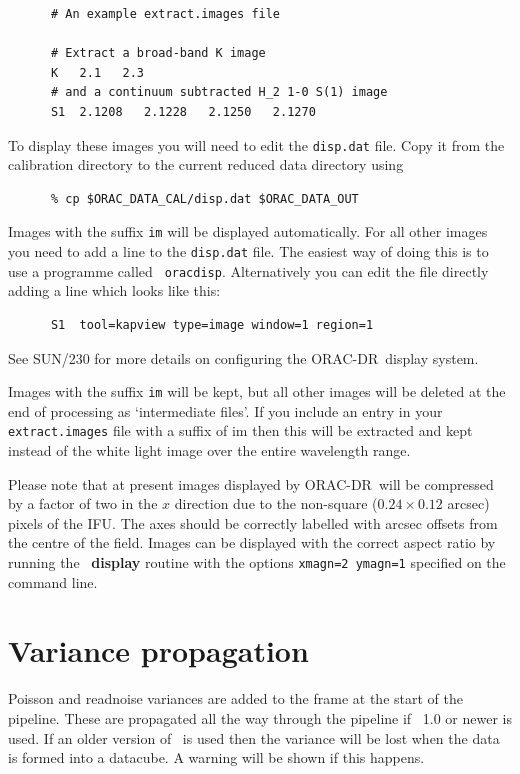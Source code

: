 \documentclass[twoside,11pt]{article}
\newcommand{\xref}[3]{#1}
\renewcommand{\_}{\texttt{\symbol{95}}}
\newcommand{\KAPPA}{\xref{{\sc{Kappa}}}{sun95}{}}
\newcommand{\ORACDR}{{\footnotesize ORAC-DR}}
\begin{document}
\begin{verbatim}
      # An example extract.images file

      # Extract a broad-band K image
      K   2.1   2.3
      # and a continuum subtracted H_2 1-0 S(1) image
      S1  2.1208   2.1228   2.1250   2.1270
\end{verbatim}

To display these images you will need to edit the {\tt disp.dat} file.
Copy it from the calibration directory to the current reduced data
directory using

\begin{verbatim}
      % cp $ORAC_DATA_CAL/disp.dat $ORAC_DATA_OUT
\end{verbatim}

Images with the suffix {\tt \_im} will be displayed automatically. For
all other images you need to add a line to the {\tt disp.dat} file.
The easiest way of doing this is to use a programme called {\tt
  oracdisp}. Alternatively you can edit the file directly adding a
line which looks like this:

\begin{verbatim}
      S1  tool=kapview type=image window=1 region=1 
\end{verbatim}

See \xref{SUN/230}{sun230}{} for more details on configuring the
\ORACDR\ display system.

Images with the suffix {\tt \_im} will be kept, but all other images
will be deleted at the end of processing as `intermediate files'. If
you include an entry in your {\tt extract.images} file with a suffix
of {im} then this will be extracted and kept instead of the white
light image over the entire wavelength range.

Please note that at present images displayed by \ORACDR\ will be
compressed by a factor of two in the $x$ direction due to the
non-square ($0.24 \times 0.12$ arcsec) pixels of the IFU. The axes
should be correctly labelled with arcsec offsets from the centre of
the field. Images can be displayed with the correct aspect ratio by
running the \KAPPA\ \xref{{\bf display}}{sun95}{DISPLAY} routine with
the options {\tt xmagn=2 ymagn=1} specified on the command line.


\section{Variance propagation}

Poisson and readnoise variances are added to the frame at the start of
the pipeline. These are propagated all the way through the pipeline if
\KAPPA\ 1.0 or newer is used. If an older version of \KAPPA\ is used
then the variance will be lost when the data is formed into a
datacube. A warning will be shown if this happens.
\end{document}
